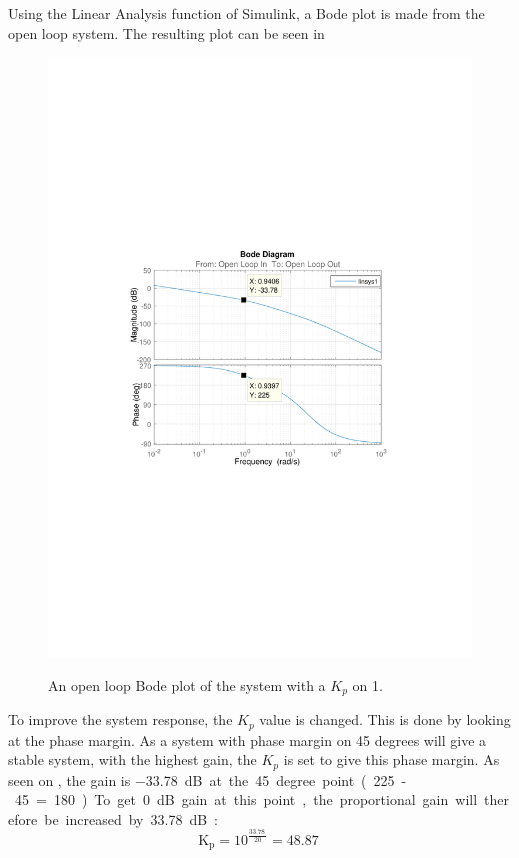 Using the Linear Analysis function of Simulink, a Bode plot is made from the open loop system. The resulting plot can be seen in 
\begin{figure}[H]
  \centering
  {
    \includegraphics[width=1.4\textwidth]{figures/distanceBode1.pdf}
  }
  \caption{An open loop Bode plot of the system with a $K_p$ on 1.}
  \label{SimulationSteeringB1}
\end{figure}

To improve the system response, the $K_p$ value is changed. This is done by looking at the phase margin. As a system with phase margin on 45 degrees will give a stable system, with the highest gain, the $K_p$ is set to give this phase margin. As seen on , the gain is \SI{-33,78}dB at the 45 degree point (225-45=180). To get 0 dB gain at this point, the proportional gain will therefore be increased by  \SI{33,78}dB:
$$\text{K}_\text{p}=10^{\frac{\SI{33,78}{}}{20}} = \SI{48,87}{}$$

